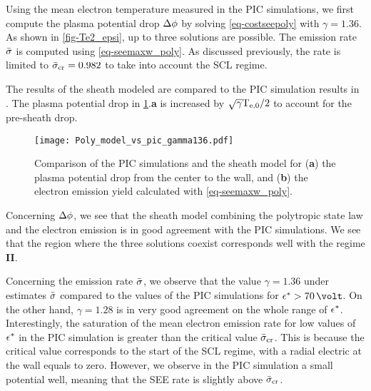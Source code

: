     Using the mean electron temperature measured in the \ac{PIC} simulations, we first compute the plasma potential drop $\Delta \phi$ by solving \cref{eq-costseepoly} with $\gamma=1.36$.
    As shown in \cref{fig-Te2_epsi}, up to three solutions are possible.
    The emission rate $ \bar{\sigma }$ is computed using \cref{eq-seemaxw_poly}.
    As discussed previously, the rate is limited to $ \bar{\sigma }_{\rm cr}=0.982$ to take into account the \ac{SCL} regime.

    The results of the sheath modeled are compared to the \ac{PIC} simulation results in .
    The plasma potential drop in \cref{fig-Poly_model_vs_pic}.{\bf a} is increased by $\sqrt{\gamma} \mathrm{T_{e, 0}}/2$ to account for the pre-sheath drop.
    
    \begin{figure}[!hbt]
      \centering
      \texttt{[image: Poly\_model\_vs\_pic\_gamma136.pdf]}
      \caption{Comparison of the PIC simulations and the sheath model for ({\bf a}) the plasma potential drop from the center to the wall, and ({\bf b}) the electron emission yield calculated with \cref{eq-seemaxw_poly}. }
      \label{fig-Poly_model_vs_pic}
    \end{figure}

    Concerning $\Delta \phi$, we see that the sheath model combining the polytropic state law and the electron emission is in good agreement with the \ac{PIC} simulations.
    We see that the region where the three solutions coexist corresponds well with the regime {\bf II}.

    Concerning the emission rate $ \bar{\sigma }$, we observe that the value $\gamma=1.36$ under estimates $ \bar{\sigma }$ compared to the values of the \ac{PIC} simulations for $\crover > 70\,\volt$.
    On the other hand, $\gamma=1.28$ is in very good agreement on the whole range of $\epsilon^{*}$.
    Interestingly, the saturation of the mean electron emission rate for low values of $\epsilon^{*}$ in the \ac{PIC} simulation is greater than the critical value $ \bar{\sigma }_{\rm cr}$.
    This is because the critical value corresponds to the start of the \ac{SCL} regime, with a radial electric at the wall equals to zero.
    However, we observe in the \ac{PIC} simulation a small potential well, meaning that the \ac{SEE} rate is slightly above $ \bar{\sigma }_{\rm cr}$.
    
